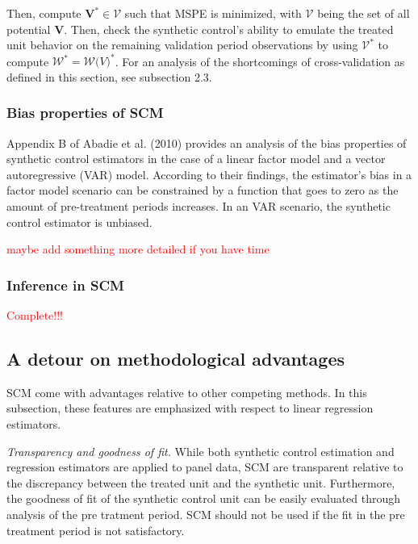 \documentclass[12pt,a4paper,draft]{article}
\begin{document}
Then, compute $\mathbf{V}^* \in \mathcal{V}$ such that MSPE is minimized, with 
$\mathcal{V}$ being the set of all potential $\mathbf{V}$. Then, check the synthetic 
control's ability to emulate the treated unit behavior on the remaining validation 
period observations by using $\mathcal{V}^*$ to compute $\mathcal{W}^*=\mathcal{W} 
\mathcal(V)^*$.
\newline For an analysis of the shortcomings of cross-validation as defined in this 
section, see subsection 2.3.



\subsubsection{Bias properties of SCM}

Appendix B of Abadie et al. (2010) provides an analysis of the bias properties of synthetic 
control estimators in the case of a linear factor model and a vector autoregressive 
(VAR) model. According to their findings, the estimator's bias in a factor model 
scenario can be constrained by a function that goes to zero as the amount of 
pre-treatment periods increases. In an VAR scenario, the synthetic control 
estimator is unbiased.

\textcolor{red}{maybe add something more detailed if you have time} %


\subsubsection{Inference in SCM}
\textcolor{red}{Complete!!!} %



\subsection{A detour on methodological advantages}

SCM come with advantages relative to other competing methods. In this subsection, 
these features are emphasized with respect to linear regression estimators. 

\emph{Transparency and goodness of fit.} While both 
synthetic control estimation and regression estimators are applied to panel data, 
SCM are transparent relative to the discrepancy between the treated unit and the 
synthetic unit. Furthermore, the goodness of fit of the synthetic control unit 
can be easily evaluated through analysis of the pre tratment period. SCM should 
not be used if the fit in the pre treatment period is not satisfactory.
\end{document}
